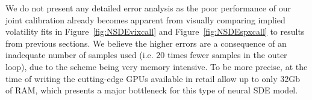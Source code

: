 We do not present any detailed error analysis as the poor performance of our joint calibration already becomes apparent from visually comparing implied volatility fits in Figure~\ref{fig:NSDEvixcall} and Figure~\ref{fig:NSDEspxcall} to results from previous sections. We believe the higher errors are a consequence of an inadequate number of samples used (i.e. 20 times fewer samples in the outer loop), due to the scheme being very memory intensive. To be more precise, at the time of writing the cutting-edge GPUs available in retail allow up to only 32Gb of RAM, which presents a major bottleneck for this type of neural SDE model.



